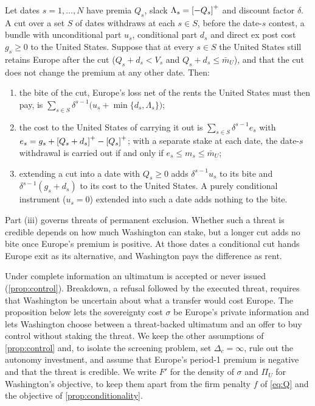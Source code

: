 \begin{lemma}\label{lem:selflimit}
Let dates $s=1,\dots,N$ have premia $Q_s$, slack $\Lambda_s=\left[-Q_s\right]^{+}$ and discount factor $\delta$. A cut over a set $S$ of dates withdraws at each $s\in S$, before the date-$s$ contest, a bundle with unconditional part $u_s$, conditional part $d_s$ and direct ex post cost $g_s\ge 0$ to the United States. Suppose that at every $s\in S$ the United States still retains Europe after the cut ($Q_s+d_s<V_s$ and $Q_s+d_s\le\bar m_U$), and that the cut does not change the premium at any other date. Then:
\begin{enumerate}[label=(\roman*)]
\item the bite of the cut, Europe's loss net of the rents the United States must then pay, is $\sum_{s\in S}\delta^{s-1}\big(u_s+\min\{d_s,\Lambda_s\}\big)$;
\item the cost to the United States of carrying it out is $\sum_{s\in S}\delta^{s-1}e_s$ with $e_s=g_s+\left[Q_s+d_s\right]^{+}-\left[Q_s\right]^{+}$; with a separate stake at each date, the date-$s$ withdrawal is carried out if and only if $e_s\le m_s\le\bar m_U$;
\item extending a cut into a date with $Q_s\ge 0$ adds $\delta^{s-1}u_s$ to its bite and $\delta^{s-1}(g_s+d_s)$ to its cost to the United States. A purely conditional instrument ($u_s=0$) extended into such a date adds nothing to the bite.
\end{enumerate}
\end{lemma}

Part (iii) governs threats of permanent exclusion. Whether such a threat is credible depends on how much Washington can stake, but a longer cut adds no bite once Europe's premium is positive. At those dates a conditional cut hands Europe exit as its alternative, and Washington pays the difference as rent.

Under complete information an ultimatum is accepted or never issued (\cref{prop:control}). Breakdown, a refusal followed by the executed threat, requires that Washington be uncertain about what a transfer would cost Europe. The proposition below lets the sovereignty cost $\sigma$ be Europe's private information and lets Washington choose between a threat-backed ultimatum and an offer to buy control without staking the threat. We keep the other assumptions of \cref{prop:control} and, to isolate the screening problem, set $\Delta_c=\infty$, rule out the autonomy investment, and assume that Europe's period-1 premium is negative and that the threat is credible. We write $F'$ for the density of $\sigma$ and $\Pi_U$ for Washington's objective, to keep them apart from the firm penalty $f$ of \cref{eq:Q} and the objective of \cref{prop:conditionality}.

